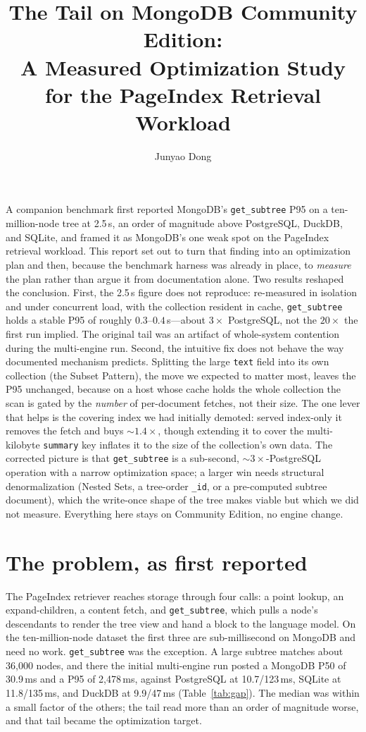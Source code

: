 \documentclass[11pt]{article}
\title{\textbf{The \code{get\_subtree} Tail on MongoDB Community Edition:\\
A Measured Optimization Study for the PageIndex Retrieval Workload}}
\author{Junyao Dong}
\date{}
\newcommand{\code}[1]{\texttt{#1}}
\renewenvironment{abstract}{%
  \par\medskip\noindent{\bfseries\abstractname.}\enspace\ignorespaces
}{\par\medskip}
\begin{document}
\maketitle

\begin{abstract}
A companion benchmark first reported MongoDB's \code{get\_subtree} P95 on a
ten-million-node tree at 2.5\,s, an order of magnitude above PostgreSQL, DuckDB,
and SQLite, and framed it as MongoDB's one weak spot on the PageIndex retrieval
workload. This report set out to turn that finding into an optimization plan
and then, because the benchmark harness was already in place, to \emph{measure}
the plan rather than argue it from documentation alone. Two results reshaped the
conclusion. First, the 2.5\,s figure does not reproduce: re-measured in
isolation and under concurrent load, with the collection resident in cache,
\code{get\_subtree} holds a stable P95 of roughly $0.3$--$0.4$\,s---about
$3\times$ PostgreSQL, not the $20\times$ the first run implied. The original tail
was an artifact of whole-system contention during the multi-engine run. Second,
the intuitive fix does not behave the way documented mechanism predicts.
Splitting the large \code{text} field into its own collection (the Subset
Pattern), the move we expected to matter most, leaves the P95 unchanged, because
on a host whose cache holds the whole collection the scan is gated by the
\emph{number} of per-document fetches, not their size. The one lever that helps
is the covering index we had initially demoted: served index-only it removes the
fetch and buys ${\sim}1.4\times$, though extending it to cover the multi-kilobyte
\code{summary} key inflates it to the size of the collection's own data. The
corrected picture is that \code{get\_subtree} is a sub-second,
${\sim}3\times$-PostgreSQL operation with a narrow optimization space; a larger
win needs structural denormalization (Nested Sets, a tree-order \code{\_id}, or a
pre-computed subtree document), which the write-once shape of the tree makes
viable but which we did not measure. Everything here stays on Community Edition,
no engine change.
\end{abstract}

\section{The problem, as first reported}

The PageIndex retriever reaches storage through four calls: a point lookup, an
expand-children, a content fetch, and \code{get\_subtree}, which pulls a node's
descendants to render the tree view and hand a block to the language model. On
the ten-million-node dataset the first three are sub-millisecond on MongoDB and
need no work. \code{get\_subtree} was the exception. A large subtree matches
about 36{,}000 nodes, and there the initial multi-engine run posted a MongoDB P50
of 30.9\,ms and a P95 of 2{,}478\,ms, against PostgreSQL at 10.7/123\,ms, SQLite
at 11.8/135\,ms, and DuckDB at 9.9/47\,ms (Table~\ref{tab:gap}). The median was
within a small factor of the others; the tail read more than an order of
magnitude worse, and that tail became the optimization target.
\end{document}
